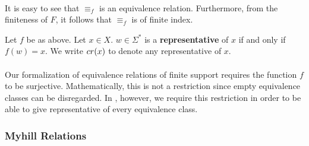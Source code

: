 \paragraph{}
It is easy to see that $\equiv_f$ is an equivalence relation. 
Furthermore, from the finiteness of $F$, it follows that $\equiv_f$ is of finite index.
%

\begin{definition}
    Let $f$ be as above. 
    Let $x \in X$. $w \in \Sigma^*$ is a \textbf{representative} of $x$ if and only if $f(w) = x$.
    We write $cr(x)$ to denote any representative of $x$.
\end{definition}



\paragraph{}
Our formalization of equivalence relations of finite support requires the function $f$ to be surjective. 
Mathematically, this is not a restriction since empty equivalence classes can be disregarded.
In \coq, however, we require this restriction in order to be able to give representative of every equivalence class.



\subsubsection{Myhill Relations}

